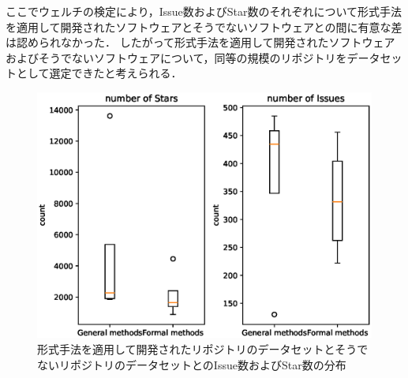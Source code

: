 \documentclass[main]{subfiles}
\begin{document}
ここでウェルチの検定により，Issue数およびStar数のそれぞれについて形式手法を適用して開発されたソフトウェアとそうでないソフトウェアとの間に有意な差は認められなかった．
したがって形式手法を適用して開発されたソフトウェアおよびそうでないソフトウェアについて，同等の規模のリポジトリをデータセットとして選定できたと考えられる．



\begin{figure}[p]
	\centering
	\includegraphics[width=\hsize]{figures/boxplot.eps}
	\caption{形式手法を適用して開発されたリポジトリのデータセットとそうでないリポジトリのデータセットとのIssue数およびStar数の分布}
	\label{fig:boxplot}
\end{figure}
\end{document}
